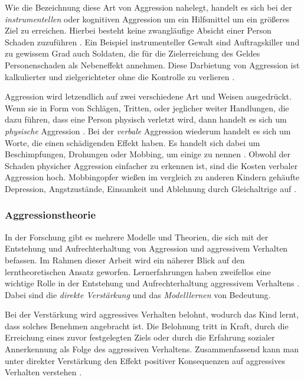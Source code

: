 Wie die Bezeichnung diese Art von Aggression nahelegt, handelt es sich bei der 
\textit{instrumentellen} oder kognitiven Aggression um ein Hilfsmittel um ein größeres Ziel zu erreichen. Hierbei besteht keine zwangläufige Absicht einer Person Schaden zuzuführen \parencite{instrumental_aggro, instrumental_dictionary}.
Ein Beispiel instrumenteller Gewalt sind Auftragskiller und zu gewissem Grad auch Soldaten, die für die Zielerreichung des Geldes Personenschaden als Nebeneffekt annehmen. Diese Darbietung von Aggression ist kalkulierter und zielgerichteter ohne die Kontrolle zu verlieren \parencite{impulsive_instrumental_aggro_healtline}.

Aggression wird letzendlich auf zwei verschiedene Art und Weisen ausgedrückt. Wenn sie in Form von Schlägen, Tritten, oder jeglicher weiter Handlungen, die dazu führen, dass eine Person physisch verletzt wird, dann handelt es sich um \textit{physische} Aggression \parencite{impulsive_instrumental_aggro_healtline, physische_verbale_aggro, physische_verbale_aggro_2}. Bei der \textit{verbale} Aggression wiederum handelt es sich um Worte, die einen schädigenden Effekt haben. Es handelt sich dabei um Beschimpfungen, Drohungen oder Mobbing, um einige zu nennen \parencite{physische_verbale_aggro, physische_verbale_aggro_2, impulsive_instrumental_aggro_healtline}. Obwohl der Schaden physicher Aggression einfacher zu erkennen ist, sind die Kosten verbaler Aggression hoch. Mobbingopfer wießen im vergleich zu anderen Kindern gehäufte Depression, Angstzustände, Einsamkeit und Ablehnung durch Gleichaltrige auf \parencite{ausmaß_verbale_aggro}.



\subsubsection{Aggressionstheorie}    \label{subsubsec_2.1.3.2}
In der Forschung gibt es mehrere Modelle und Theorien, die sich  mit der Entstehung und Aufrechterhaltung von Aggression und aggressivem Verhalten befassen. Im Rahmen dieser Arbeit wird ein näherer Blick auf den lerntheoretischen Ansatz geworfen. Lernerfahrungen haben zweifellos eine wichtige Rolle in der Entstehung und Aufrechterhaltung aggressivem Verhaltens \parencite{Aggro_Theorie}. Dabei sind die \textit{direkte Verstärkung} und das \textit{Modelllernen} von Bedeutung. 

Bei der Verstärkung wird aggressives Verhalten belohnt, wodurch das Kind lernt, dass solches Benehmen angebracht ist. Die Belohnung tritt in Kraft, durch die Erreichung eines zuvor festgelegten Ziels oder durch die Erfahrung sozialer Annerkennung als Folge des aggressiven Verhaltens. Zusammenfassend kann man unter direkter Verstärkung den Effekt positiver Konsequenzen auf aggressives Verhalten verstehen \parencite{Aggro_Theorie_Buch}.


